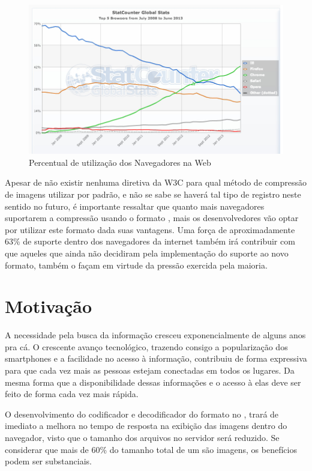 \documentclass[espaco=simples,appendix=Name]{abnt}
\begin{document}
\begin{figure}[h]
  \centering
    \includegraphics[scale=0.5]{BrowserCounter_2013.png}
  \caption{Percentual de utilização dos Navegadores na Web \cite{BrowserStats}}
\end{figure}

Apesar de não existir nenhuma diretiva da W3C para qual método de compressão de imagens utilizar por padrão, e não se sabe se haverá tal tipo de registro neste sentido no futuro, é importante ressaltar que quanto mais navegadores suportarem a compressão usando o formato , mais os desenvolvedores vão optar por utilizar este formato dada suas vantagens. Uma força de aproximadamente 63\% de suporte dentro dos navegadores da internet também irá contribuir com que aqueles que ainda não decidiram pela implementação do suporte ao novo formato, também o façam em virtude da pressão exercida pela maioria.

\section{Motivação}

A necessidade pela busca da informação cresceu exponencialmente de alguns anos pra cá. O crescente avanço tecnológico, trazendo consigo a popularização dos smartphones e a facilidade no acesso à informação, contribuiu de forma expressiva para que cada vez mais as pessoas estejam conectadas em todos os lugares. Da mesma forma que a disponibilidade dessas informações e o acesso à elas deve ser feito de forma cada vez mais rápida.

O desenvolvimento do codificador e decodificador do formato  no , trará de imediato a melhora no tempo de resposta na exibição das imagens dentro do navegador, visto que o tamanho dos arquivos no servidor será reduzido. Se considerar que mais de 60\% do tamanho total de um  são imagens, os benefícios podem ser substanciais. 
\end{document}
